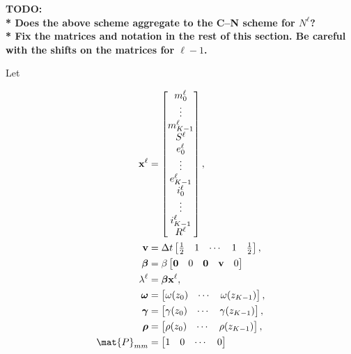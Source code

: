 \documentclass{jpmarticle}
\renewcommand{\vec}[1]{\boldsymbol{\mathrm{#1}}}
\let\subequationsorig\subequations%
\let\endsubequationsorig\endsubequations%
\renewenvironment{subequations}{
  \subequationsorig
  \renewcommand{\theequation}{\theparentequation.\arabic{equation}}
}{
  \endsubequationsorig
}
\begin{document}
\textbf{TODO:\\
  * Does the above scheme aggregate to the C–N scheme for
  $N^{\ell}$?\\
  * Fix the matrices and notation in the rest of this section. Be
  careful with the shifts on the matrices for $\ell - 1$.
}

Let
\begin{subequations}
  \begin{align}
    \vec{x}^{\ell} &=
    \begin{bmatrix}
      m_0^{\ell} \\ \vdots \\ m_{K - 1}^{\ell} \\
      S^{\ell} \\
      e_0^{\ell} \\ \vdots \\ e_{K - 1}^{\ell} \\
      i_0^{\ell} \\ \vdots \\ i_{K - 1}^{\ell} \\
      R^{\ell}
    \end{bmatrix},
    \\
    \vec{v} &=
    \Delta t
    \begin{bmatrix}
      \frac{1}{2} & 1 & \cdots & 1 & \frac{1}{2}
    \end{bmatrix},
    \\
    \vec{\beta} &=
    \beta
    \begin{bmatrix}
      \vec{0} & 0 & \vec{0} & \vec{v} & 0
    \end{bmatrix}
    \\
    \lambda^{\ell} &=
    \vec{\beta} \vec{x}^{\ell},
    \\
    \vec{\omega} &=
    \begin{bmatrix}
      \omega(z_0) & \cdots & \omega(z_{K - 1})
    \end{bmatrix},
    \\
    \vec{\gamma} &=
    \begin{bmatrix}
      \gamma(z_0) & \cdots & \gamma(z_{K - 1})
    \end{bmatrix},
    \\
    \vec{\rho} &=
    \begin{bmatrix}
      \rho(z_0) & \cdots & \rho(z_{K - 1})
    \end{bmatrix},
    \\
    \mat{P}_{mm} &=
    \begin{bmatrix}
      1 & 0 & \cdots & 0

\end{bmatrix}
\end{align}
\end{subequations}
\end{document}
